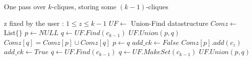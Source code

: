 \begin{algorithm}[!htbp]
  \caption{One pass over $k$-cliques, storing some $(k-1)$-cliques}
  \begin{algorithmic}[1]
    \State z fixed by the user : $1 \leq z \leq k-1$
    \State $UF \leftarrow$ Union-Find datastructure 
    \State $Comz \leftarrow$ List$\{\}$ 
    \State $p\leftarrow NULL$
    \State $q\leftarrow UF.Find(c_{k-1})$
    \State $UF.Union(p,q)$
    \State $Comz[q] = Comz[p] \cup Comz[q]$
    \EndIf
    \State $p \leftarrow q$
    \EndFor
    \State $add\_ck \leftarrow False$
    \State $Comz[p].add(c_z)$
    \State $add\_ck \leftarrow True$
    \EndIf
    \EndFor
    \State $q\leftarrow UF.Find(c_{k-1})$
    \State $q \leftarrow UF.MakeSet(c_{k-1})$
    \State $UF.Union(p,q)$
    \EndIf
    \EndFor
    \EndIf
    \EndFor
  \end{algorithmic}
\end{algorithm} 
